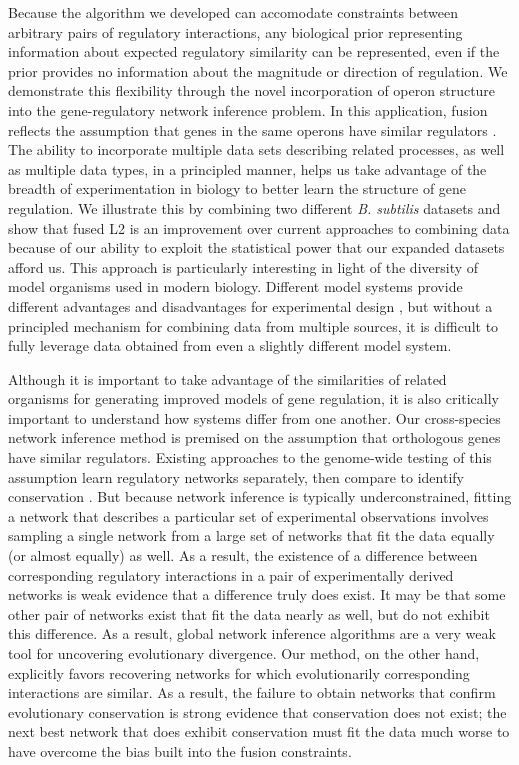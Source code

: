 \documentclass[11pt]{article}
\begin{document}
Because the algorithm we developed can accomodate constraints between arbitrary pairs of regulatory interactions, any biological prior representing information about expected regulatory similarity can be represented, even if the prior provides no information about the magnitude or direction of regulation. We demonstrate this flexibility through the novel incorporation of operon structure into the gene-regulatory network inference problem. In this application, fusion reflects the assumption that genes in the same operons have similar regulators \cite{lawrence_shared_2002}. The ability to incorporate multiple data sets describing related processes, as well as multiple data types, in a principled manner, helps us take advantage of the breadth of experimentation in biology to better learn the structure of gene regulation. We illustrate this by combining two different \textit{B. subtilis} datasets and show that fused L2 is an improvement over current approaches to combining data \cite{marbach_revealing_2010} because of our ability to exploit the statistical power that our expanded datasets afford us. This approach is particularly interesting in light of the diversity of model organisms used in modern biology. Different model systems provide different advantages and disadvantages for experimental design \cite{stolfi_genetic_2012}, but without a principled mechanism for combining data from multiple sources, it is difficult to fully leverage data obtained from even a slightly different model system. 

Although it is important to take advantage of the similarities of related organisms for generating improved models of gene regulation, it is also critically important to understand how systems differ from one another. Our cross-species network inference method is premised on the assumption that orthologous genes have similar regulators. Existing approaches to the genome-wide testing of this assumption learn regulatory networks separately, then compare to identify conservation \cite{aytes_cross-species_2014, Wang2014a}. But because network inference is typically underconstrained, fitting a network that describes a particular set of experimental observations involves sampling a single network from a large set of networks that fit the data equally (or almost equally) as well. As a result, the existence of a difference between corresponding regulatory interactions in a pair of experimentally derived networks is weak evidence that a difference truly does exist. It may be that some other pair of networks exist that fit the data nearly as well, but do not exhibit this difference. As a result, global network inference algorithms are a very weak tool for uncovering evolutionary divergence. Our method, on the other hand, explicitly favors recovering networks for which evolutionarily corresponding interactions are similar. As a result, the failure to obtain networks that confirm evolutionary conservation is strong evidence that conservation does not exist; the next best network that does exhibit conservation must fit the data much worse to have overcome the bias built into the fusion constraints. 
\end{document}
